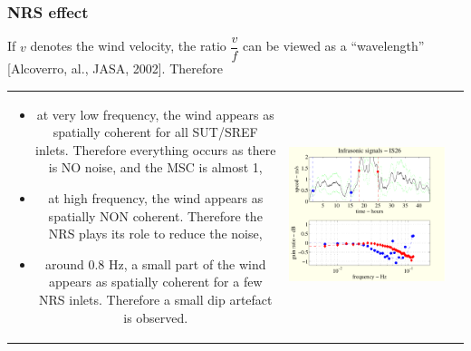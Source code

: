 \documentclass[handout,10pt]{beamer}
\begin{document}
\begin{frame}
\frametitle{NRS effect}

If $v$ denotes the wind velocity, the ratio $\dfrac{v}{f}$ can be viewed as a ``wavelength'' [Alcoverro, al., JASA,
2002]. Therefore


\begin{tabular}{clc}
\hspace{-1cm}
\begin{minipage}{6cm}
\begin{itemize}
\item
{\color{red}at very low frequency}, 
{ the wind appears as spatially coherent for all SUT/SREF inlets. Therefore everything occurs as there is NO noise, and the MSC is almost 1},
\item
{\color{red}at high frequency},  
{the wind appears as spatially NON coherent. Therefore the NRS plays its role to reduce the noise},
\item
{\color{red}around $0.8$ Hz}, 
{a small part of the wind appears as  spatially coherent for a few NRS inlets. Therefore a small dip artefact is observed}.
\end{itemize}
\end{minipage}
&
\begin{minipage}{7.5cm}
\includegraphics[scale=0.45]{twospeedster.pdf}
\end{minipage}
\end{tabular}
\end{frame}
\end{document}
